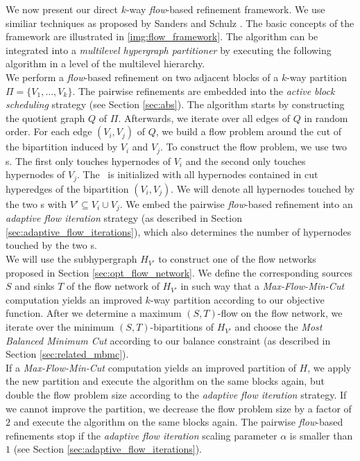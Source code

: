 We now present our direct $k$-way \emph{flow}-based refinement framework. 
We use similiar techniques as proposed
by Sanders and Schulz \cite{sanders2011engineering}. 
The basic concepts of the framework are illustrated in \autoref{img:flow_framework}.
The algorithm can be integrated into a \emph{multilevel hypergraph partitioner} 
by executing the following algorithm in a level of the multilevel hierarchy.  \\
We perform a \emph{flow}-based refinement on two adjacent blocks of
a $k$-way partition $\Pi = \{V_1,\ldots,V_k\}$. The pairwise refinements are embedded 
into the \emph{active block scheduling} strategy (see Section \ref{sec:abs}).
The algorithm starts by constructing the quotient graph $Q$ of $\Pi$. 
Afterwards, we iterate over all edges of $Q$ in random order. For each edge
$(V_i,V_j)$ of $Q$, we build a flow problem around the cut of the bipartition
induced by $V_i$ and $V_j$. To construct the flow problem, we use two \BFS s. The first only 
touches hypernodes of $V_i$ and the second only touches hypernodes of $V_j$.
The \BFS~is initialized with all hypernodes contained in cut hyperedges
of the bipartition $(V_i,V_j)$. We will denote all hypernodes touched by 
the two \BFS s with $V' \subseteq V_i \cup V_j$.
We embed the pairwise \emph{flow}-based refinement
into an \emph{adaptive flow iteration} strategy
(as described in Section \ref{sec:adaptive_flow_iterations}), which also determines
the number of hypernodes touched by the two \BFS s. \\
We will use the subhypergraph $H_{V'}$ to construct one of the flow networks 
proposed in Section \ref{sec:opt_flow_network}. 
We define the corresponding sources $S$
and sinks $T$ of the flow network of $H_{V'}$ in such way that a \emph{Max-Flow-Min-Cut} 
computation yields an improved $k$-way partition according to our objective function.
After we determine a maximum $(S,T)$-flow on the flow network, we iterate over
the minimum $(S,T)$-bipartitions of $H_{V'}$  and choose 
the \emph{Most Balanced Minimum Cut} according to our balance constraint
(as described in Section \ref{sec:related_mbmc}). \\
If a \emph{Max-Flow-Min-Cut} computation yields an improved partition of $H$, we apply
the new partition and execute the algorithm on the same blocks again, but double
the flow problem size according to the \emph{adaptive flow iteration} strategy. If
we cannot improve the partition, we decrease the flow problem size by a factor of $2$
and execute the algorithm on the same blocks again. The pairwise \emph{flow}-based
refinements stop if the \emph{adaptive flow iteration} scaling parameter $\alpha$ is
smaller than $1$ (see Section \ref{sec:adaptive_flow_iterations}).

